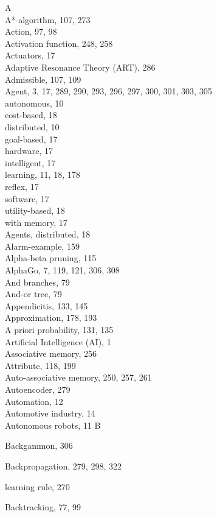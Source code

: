 \documentclass[10pt]{book}
\begin{document}
A\\
A*-algorithm, 107, 273\\
Action, 97, 98\\
Activation function, 248, 258\\
Actuators, 17\\
Adaptive Resonance Theory (ART), 286\\
Admissible, 107, 109\\
Agent, 3, 17, 289, 290, 293, 296, 297, 300, 301, 303, 305\\
\quad autonomous, 10\\
\quad cost-based, 18\\
\quad distributed, 10\\
\quad goal-based, 17\\
\quad hardware, 17\\
\quad intelligent, 17\\
\quad learning, 11, 18, 178\\
\quad reflex, 17\\
\quad software, 17\\
\quad utility-based, 18\\
\quad with memory, 17\\
Agents, distributed, 18\\
Alarm-example, 159\\
Alpha-beta pruning, 115\\
AlphaGo, 7, 119, 121, 306, 308\\
And branches, 79\\
And-or tree, 79\\
Appendicitis, 133, 145\\
Approximation, 178, 193\\
A priori probability, 131, 135\\
Artificial Intelligence (AI), 1\\
Associative memory, 256\\
Attribute, 118, 199\\
Auto-associative memory, 250, 257, 261\\
Autoencoder, 279\\
Automation, 12\\
Automotive industry, 14\\
Autonomous robots, 11
B

Backgammon, 306

Backpropagation, 279, 298, 322

learning rule, 270

Backtracking, 77, 99
\end{document}

